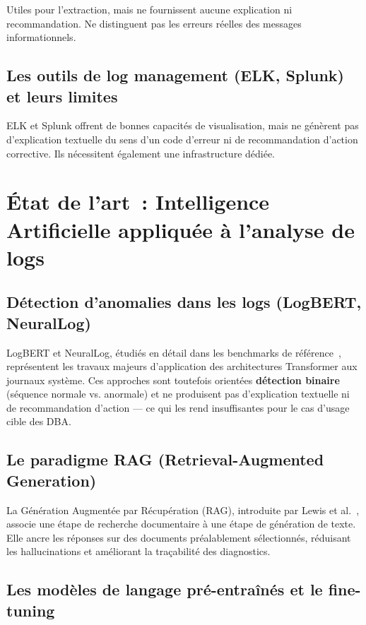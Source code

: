 \documentclass[12pt,a4paper]{report}
\begin{document}
Utiles pour l'extraction, mais ne fournissent aucune explication ni recommandation.
Ne distinguent pas les erreurs r\'eelles des messages informationnels.

\subsection{Les outils de log management (ELK, Splunk) et leurs limites}

ELK et Splunk offrent de bonnes capacit\'es de visualisation, mais ne g\'en\`erent
pas d'explication textuelle du sens d'un code d'erreur ni de recommandation d'action
corrective. Ils n\'ecessitent \'egalement une infrastructure d\'edi\'ee.

\section{\'Etat de l'art~: Intelligence Artificielle appliqu\'ee \`a l'analyse de logs}

\subsection{D\'etection d'anomalies dans les logs (LogBERT, NeuralLog)}

LogBERT et NeuralLog, \'etudi\'es en d\'etail dans les benchmarks de r\'ef\'erence~\cite{le2022log,zhu2019log},
repr\'esentent les travaux majeurs d'application des architectures Transformer aux journaux syst\`eme.
Ces approches sont toutefois orient\'ees \textbf{d\'etection binaire} (s\'equence normale vs.
anormale) et ne produisent pas d'explication textuelle ni de recommandation d'action --- ce qui les rend
insuffisantes pour le cas d'usage cible des DBA.

\subsection{Le paradigme RAG (Retrieval-Augmented Generation)}

La G\'en\'eration Augment\'ee par R\'ecup\'eration (RAG), introduite par Lewis et al.~\cite{lewis2020rag},
associe une \'etape de recherche documentaire \`a une \'etape de g\'en\'eration de
texte. Elle ancre les r\'eponses sur des documents pr\'ealablement s\'electionn\'es,
r\'eduisant les hallucinations et am\'eliorant la tra\c cabilit\'e des diagnostics.

\subsection{Les mod\`eles de langage pr\'e-entra\^in\'es et le fine-tuning}
\end{document}
